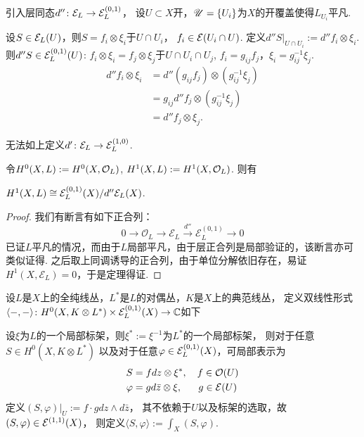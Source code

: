 \begin{definition}
	引入层同态$d''\colon\mathcal{E}_L\rightarrow \mathcal{E}_L^{(0,1)}$，
    设$U\subset X$开，$\mathscr{U}=\{U_i\}$为$X$的开覆盖使得$L_{U_i}$平凡.

	设$S\in \mathcal{E}_L(U)$，则$S=f_i\otimes \xi_i$于$U\cap U_i$，
    $f_i\in \mathcal{E}(U_i\cap U)$. 定义$d''S|_{U\cap U_i}:=d''f_i\otimes \xi_i$. 
    则$d''S\in \mathcal{E}_{L}^{(0,1)}(U)$: 
    $f_i\otimes \xi_i=f_j\otimes \xi_j$于$U\cap U_i\cap U_j$, 
    $f_i=g_{ij}f_j$，$\xi_i=g_{ij}^{-1}\xi_j$. 
	\begin{align*}
		d''f_i\otimes \xi_i&=d''(g_{ij}f_j)\otimes (g_{ij}^{-1}\xi_j)\\
		&=g_{ij}d''f_j\otimes (g_{ij}^{-1}\xi_j)\\
		&=d''f_j\otimes \xi_j.
	\end{align*}
\end{definition}

\begin{remark}
	无法如上定义$d'\colon\mathcal{E}_L\rightarrow \mathcal{E}_L^{(1,0)}$.
\end{remark}

令$H^0(X,L):=H^0(X,\mathcal{O}_L)$, $H^1(X,L):=H^1(X,\mathcal{O}_L)$. 则有

\begin{theorem}[Dolbeault定理]
	$H^1(X,L)\cong \mathcal{E}_L^{(0,1)}(X)/d''\mathcal{E}_L(X)$.
\end{theorem}
\begin{proof}
    我们有断言有如下正合列：
    $$ 0 \to \mathcal{O}_L \rightarrow \mathcal{E}_L \xrightarrow{d''} \mathcal{E}_L^{(0,1)} \to 0 $$
    已证$L$平凡的情况，而由于$L$局部平凡，由于层正合列是局部验证的，该断言亦可类似证得. 之后取上同调诱导的正合列，由于单位分解依旧存在，易证$H^1(X,\mathcal{E}_L)=0$，于是定理得证.
\end{proof}

\begin{definition}
	设$L$是$X$上的全纯线丛，$L^*$是$L$的对偶丛，$K$是$X$上的典范线丛，
    定义双线性形式$\langle-,-\rangle\colon 
    H^0(X,K\otimes L^*)\times \mathcal{E}_L^{(0,1)}(X)\rightarrow \mathbb{C}$如下

	设$\xi$为$L$的一个局部标架，则$\xi^*:=\xi^{-1}$为$L^*$的一个局部标架，
    则对于任意$S\in H^0(X,K\otimes L^*)$
    以及对于任意$\varphi\in \mathcal{E}_L^{(0,1)}(X)$，可局部表示为
	\begin{align*}
        S&=fdz\otimes \xi^*, \quad f\in \mathcal{O}(U)\\
        \varphi&=gd\bar{z}\otimes \xi, \quad\ \ g\in \mathcal{E}(U)
    \end{align*}
	定义$(S,\varphi)|_U:=f\cdot gdz\wedge d\bar{z}$，
    其不依赖于$U$以及标架的选取，故$(S,\varphi)\in \mathcal{E}^{(1,1)}(X)$，
    则定义$\langle S,\varphi\rangle:=\int_X (S,\varphi)$.
\end{definition}

